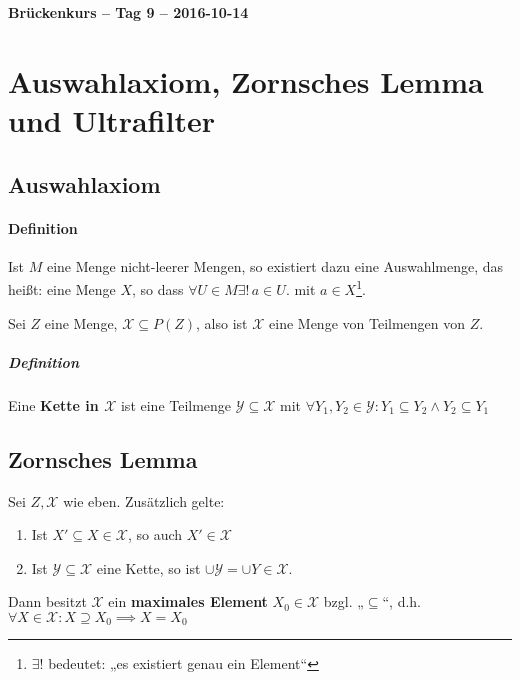 \documentclass[14pt,a4paper]{article}
\begin{document}
	\begin{center}
		\Huge\textbf{Brückenkurs – Tag 9 – 2016-10-14}
	\end{center}

  \setcounter{section}{12}
  \section{Auswahlaxiom, Zornsches Lemma und Ultrafilter}

  \subsection{Auswahlaxiom}

  \paragraph{Definition}

  Ist $M$ eine Menge nicht-leerer Mengen, so existiert dazu eine Auswahlmenge,
  das heißt: eine Menge $X$, so dass $\forall U \in M \exists!\, a \in U$. mit $a
  \in X$\footnote{$\exists\text{!}$ bedeutet: „es existiert genau ein Element“}.

  Sei $Z$ eine Menge, $\mathscr{X} \subseteq P(Z)$, also ist $\mathscr{X}$
  eine Menge von Teilmengen von $Z$.

  \subparagraph{Definition}
  Eine \textbf{Kette in $\mathscr{X}$} ist eine Teilmenge $ \mathscr{Y}
  \subseteq \mathscr{X}$ mit $ \forall Y_1, Y_2 \in \mathscr{Y} : Y_1 \subseteq
  Y_2 \land Y_2 \subseteq Y_1 $

  \subsection{Zornsches Lemma}
  Sei $Z, \mathscr{X}$ wie eben.
  Zusätzlich gelte:
  \begin{enumerate}
    \item Ist $X' \subseteq X \in \mathscr{X}$, so auch $X' \in \mathscr{X}$
    \item Ist $\mathscr{Y \subseteq X}$ eine Kette, so ist $\cup \mathscr{Y} =
      \cup Y \in \mathscr{X}$.
  \end{enumerate}

  Dann besitzt $\mathscr{X}$ ein \textbf{maximales Element} $X_0 \in \mathscr{X}$ bzgl.
  „$\subseteq$“, d.h. $\forall X \in \mathscr{X}: X \supseteq X_0 \implies X =
  X_0$
\end{document}

